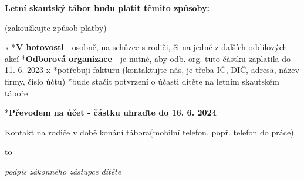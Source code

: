 \noindent
\medskip
\parindent=1pt

{\bf Letní skautský tábor budu platit těmito způsoby:}
\parindent=0cm

(zakoužkujte způsob platby)

\begitems \style x
*{\bf V hotovosti} - osobně, na schůzce s rodiči, či na jedné z dalších oddílových akcí
*{\bf Odborová organizace} -  je nutné, aby odb. org. tuto částku zaplatila do 11. 6. 2023
\begitems \style x
*potřebuji fakturu (kontaktujte nás, je třeba IČ, DIČ, adresa, název firmy, číslo účtu)
*bude stačit potvrzení o účasti dítěte na letním skautském táboře
\enditems

*{\bf Převodem na účet - částku uhraďte do 16. 6. 2024}
\enditems

\medskip
Kontakt na rodiče v době konání tábora(mobilní telefon, popř. telefon do práce)
\vskip 2cm

\hbox to 

{\hfill\it\typosize[7/13]podpis zákonného zástupce dítěte}
\bye
